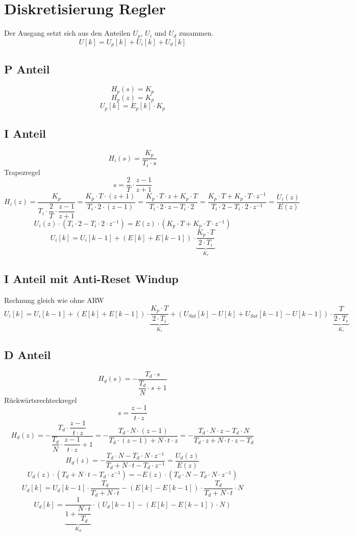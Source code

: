 \section{Diskretisierung Regler}
Der Ausgang setzt sich aus den Anteilen $U_p$, $U_i$ und $U_d$ zusammen. 
\[ U[k] = U_p[k] + U_i[k] + U_d[k] \]

\subsection{P Anteil}
\[ H_p(s) = K_p \]
\[ H_p(z) = K_p \]
\[ U_p[k] = E_p[k] \cdot K_p \]

\subsection{I Anteil}
\[ H_i(s) = \frac{K_p}{T_i \cdot s} \]
Trapezregel
\[ s = \frac{2}{T} \cdot \frac{z - 1}{z + 1} \]
\[ H_i(z) = \frac{K_p}{T_i \cdot \dfrac{2}{T} \cdot \dfrac{z - 1}{z + 1}}
 = \frac{K_p \cdot T \cdot (z + 1)}{T_i \cdot 2 \cdot (z - 1)}
 = \frac{K_p \cdot T \cdot z + K_p \cdot T}{T_i \cdot 2 \cdot z - T_i \cdot 2}
 = \frac{K_p \cdot T + K_p \cdot T \cdot z^{-1}}{T_i \cdot 2 - T_i \cdot 2 \cdot z^{-1}}
 = \frac{U_i(z)}{E(z)} \]
\[ U_i(z) \cdot (T_i \cdot 2 - T_i \cdot 2 \cdot z^{-1})
 = E(z) \cdot (K_p \cdot T + K_p \cdot T \cdot z^{-1}) \]
\[ U_i[k] =  U_i[k-1] + \left(E[k] + E[k-1]\right) \cdot
 \underbrace{\frac{K_p \cdot T}{2 \cdot T_i}}_{K_i} \]

\subsection{I Anteil mit Anti-Reset Windup}
Rechnung gleich wie ohne ARW
\[ U_i[k] =  U_i[k-1] + \left(E[k] + E[k-1]\right) \cdot
 \underbrace{\frac{K_p \cdot T}{2 \cdot T_i}}_{K_i}
 + \left(U_{Sat}[k] - U[k] + U_{Sat}[k-1] - U[k-1]\right) \cdot
 \underbrace{\frac{T}{2 \cdot T_r}}_{K_r} \]

\subsection{D Anteil}
\[ H_d(s) = - \frac{T_d \cdot s}{\dfrac{T_d}{N} \cdot s + 1} \]
Rückwärtsrechteckregel
\[ s = \frac{z - 1}{t \cdot z} \]
\[ H_d(z) = -\frac{T_d \cdot \dfrac{z - 1}{t \cdot z}}{\dfrac{T_d}{N} \cdot \dfrac{z - 1}{t \cdot z} + 1}
 = -\frac{T_d \cdot N \cdot (z - 1)}{T_d \cdot (z - 1) + N \cdot t \cdot z}
 = -\frac{T_d \cdot N \cdot z - T_d \cdot N}{T_d \cdot z + N \cdot t \cdot z - T_d} \]
\[ H_d(z) = -\frac{T_d \cdot N - T_d \cdot N \cdot z^{-1}}{T_d + N \cdot t - T_d \cdot z^{-1}}
 = \frac{U_d(z)}{E(z)} \]
\[ U_d(z) \cdot (T_d + N \cdot t - T_d \cdot z^{-1})
 = - E(z) \cdot (T_d \cdot N - T_d \cdot N \cdot z^{-1}) \]
\[ U_d[k] = U_d[k-1] \cdot \frac{T_d}{T_d + N \cdot t}
 - \left(E[k] - E[k-1]\right) \cdot \frac{T_d}{T_d + N \cdot t} \cdot N \]
\[ U_d[k] = \underbrace{\frac{1}{1 + \dfrac{N \cdot t}{T_d}}}_{K_d} \cdot \left(U_d[k-1]
 - \left(E[k] - E[k-1]\right) \cdot N\right) \]

